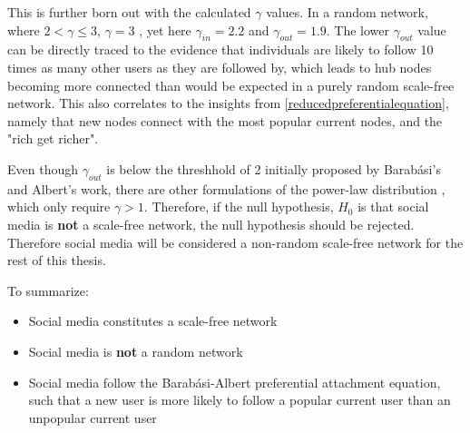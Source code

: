 \documentclass[NETN,manuscript]{stjour-new}
\begin{document}
This is further born out with the calculated $\gamma$ values. In a random network, where $2 < \gamma \leq 3$, $\gamma = 3$ \citep{barabasi2000scale,pastor2001epidemic}, yet here $\gamma_{in} = 2.2$ and $\gamma_{out} = 1.9$. The lower $\gamma_{out}$ value can be directly traced to the evidence that individuals are likely to follow 10 times as many other users as they are followed by, which leads to hub nodes becoming more connected than would be expected in a purely random scale-free network. This also correlates to the insights from \ref{reducedpreferentialequation}, namely that new nodes connect with the most popular current nodes, and the "rich get richer".

Even though $\gamma_{out}$ is below the threshhold of 2 initially proposed by Barab{\'a}si's and Albert's work, there are other formulations of the power-law distribution \citep{ichinose2017invasion,albert1999diameter,mislove2007measurement,zhang2015exactly,pastor2002epidemic}, which only require $\gamma > 1$. Therefore, if the null hypothesis, $H_0$ is that social media is \textbf{not} a scale-free network, the null hypothesis should be rejected. Therefore social media will be considered a non-random scale-free network for the rest of this thesis.

To summarize:
\begin{itemize}
    \item Social media constitutes a scale-free network
    \item Social media is \textbf{not} a random network
    \item Social media follow the Barab{\'a}si-Albert preferential attachment equation, such that a new user is more likely to follow a popular current user than an unpopular current user
\end{itemize}

\end{document}
